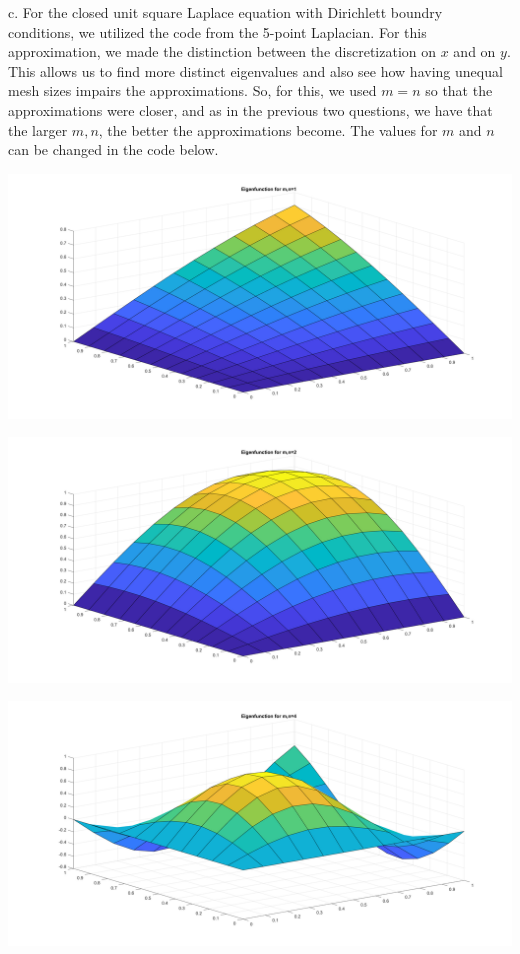 \begin{solution}
    c. For the closed unit square Laplace equation with Dirichlett boundry conditions, we utilized the
    code from the 5-point Laplacian. For this approximation, we made the distinction between the
    discretization on $x$ and on $y$. This allows us to find more distinct eigenvalues and also see how
    having unequal mesh sizes impairs the approximations. So, for this, we used $m=n$ so that the
    approximations were closer, and as in the previous two questions, we have that the larger $m,n$, the
    better the approximations become. The values for $m$ and $n$ can be changed in the code below.
    
    \begin{center}
        \includegraphics[scale=0.15]{1c11.PNG}
    \end{center}
    \begin{center}
        \includegraphics[scale=0.15]{1c22.PNG}
    \end{center}
    \begin{center}
        \includegraphics[scale=0.15]{1c44.PNG}
    \end{center}

\end{solution}

\newpage

\newpage

\newpage
